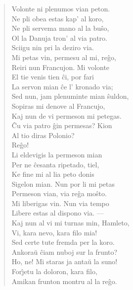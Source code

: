 \begin{verse}
                Volonte ni plenumos vian peton.\\
                Ne pli obea estas kap' al koro,\\
                Ne pli servema mano al la bu\^so,\\
                Ol la Danuja tron' al via patro.\\
                Sciigu nin pri la deziro via.\\
 Mi petas vin, permesu al mi, reĝo,\\
                Reiri nun Francujon. Mi volonte\\
                El tie venis tien \^ci, por fari\\
                La servon mian \^ce l' kronado via;\\
                Sed nun, jam plenuminte mian \^suldon,\\
                Sopiras mi denove al Francujo,\\
                Kaj nun de vi permeson mi petegas.\\
 \^Cu via patro \^gin permesas? Kion\\
                Al tio diras Polonio?\\
 Reĝo!\\
                Li eldevigis la permeson mian\\
                Per ne \^cesanta ripetado, tiel,\\
                Ke fine mi al lia peto donis\\
                Sigelon mian. Nun por li mi petas\\
                Permeson vian, via re\^ga mo\^sto.\\
 Mi liberigas vin. Nun via tempo\\
                Libere estas al dispono via. ---\\
                Kaj nun al vi mi turnas min, Hamleto,\\
                Vi, kara nevo, kara filo mia!\\
Sed certe tute fremda per la koro.\\
 Ankora\u u \^ciam nuboj sur la frunto?\\
 Ho, ne! Mi staras ja anta\u u la suno!\\
 For\^{\j}etu la doloron, kara filo,\\
                Amikan frunton montru al la reĝo.\\

\end{verse}
